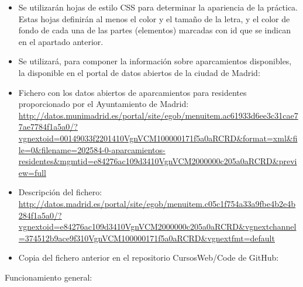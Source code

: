 \begin{itemize}
\item Se utilizarán hojas de estilo CSS para determinar la apariencia de la práctica. Estas hojas definirán al menos el color y el tamaño de la letra, y el color de fondo de cada una de las partes (elementos) marcadas con id que se indican en el apartado anterior.

\item Se utilizará, para componer la información sobre aparcamientos disponibles, la disponible en el portal de datos abiertos de la ciudad de Madrid:

  \item Fichero con los datos abiertos de aparcamientos para residentes proporcionado por el Ayuntamiento de Madrid: \\
    \url{http://datos.munimadrid.es/portal/site/egob/menuitem.ac61933d6ee3c31cae77ae7784f1a5a0/?vgnextoid=00149033f2201410VgnVCM100000171f5a0aRCRD&format=xml&file=0&filename=202584-0-aparcamientos-residentes&mgmtid=e84276ac109d3410VgnVCM2000000c205a0aRCRD&preview=full}

  \item Descripción del fichero: \\
    \url{http://datos.madrid.es/portal/site/egob/menuitem.c05c1f754a33a9fbe4b2e4b284f1a5a0/?vgnextoid=e84276ac109d3410VgnVCM2000000c205a0aRCRD&vgnextchannel=374512b9ace9f310VgnVCM100000171f5a0aRCRD&vgnextfmt=default}
      
  \item Copia del fichero anterior en el repositorio CursosWeb/Code de GitHub: \\
\end{itemize}

Funcionamiento general:

